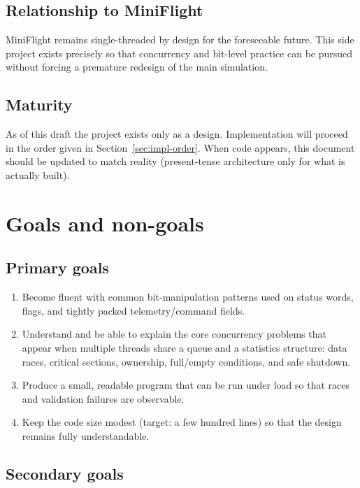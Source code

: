 \documentclass[11pt,a4paper]{article}
\begin{document}
\subsection{Relationship to MiniFlight}

MiniFlight remains single-threaded by design for the foreseeable future.
This side project exists precisely so that concurrency and bit-level practice can be pursued without forcing a premature redesign of the main simulation.

\subsection{Maturity}

As of this draft the project exists only as a design.
Implementation will proceed in the order given in Section~\ref{sec:impl-order}.
When code appears, this document should be updated to match reality (present-tense architecture only for what is actually built).

\section{Goals and non-goals}
\label{sec:goals}

\subsection{Primary goals}

\begin{enumerate}[leftmargin=*]
    \item Become fluent with common bit-manipulation patterns used on status words, flags, and tightly packed telemetry/command fields.
    \item Understand and be able to explain the core concurrency problems that appear when multiple threads share a queue and a statistics structure: data races, critical sections, ownership, full/empty conditions, and safe shutdown.
    \item Produce a small, readable program that can be run under load so that races and validation failures are observable.
    \item Keep the code size modest (target: a few hundred lines) so that the design remains fully understandable.
\end{enumerate}

\subsection{Secondary goals}
\end{document}
